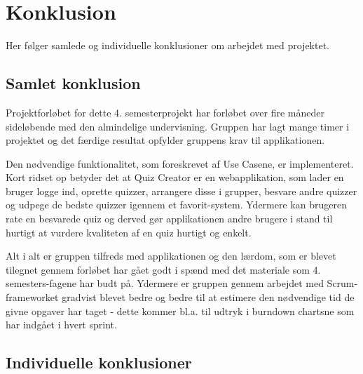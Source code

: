 \chapter{Konklusion}
Her følger samlede og individuelle konklusioner om arbejdet med projektet.

\section{Samlet konklusion}
Projektforløbet for dette 4. semesterprojekt har forløbet over fire måneder sideløbende med den almindelige undervisning. Gruppen har lagt mange timer i projektet og det færdige resultat opfylder gruppens krav til applikationen.

Den nødvendige funktionalitet, som foreskrevet af Use Casene, er implementeret. Kort ridset op betyder det at Quiz Creator er en webapplikation, som lader en bruger logge ind, oprette quizzer, arrangere disse i grupper, besvare andre quizzer og udpege de bedste quizzer igennem et favorit-system. Ydermere kan brugeren rate en besvarede quiz og derved gør applikationen andre brugere i stand til hurtigt at vurdere kvaliteten af en quiz hurtigt og enkelt.

Alt i alt er gruppen tilfreds med applikationen og den lærdom, som er blevet tilegnet gennem forløbet har gået godt i spænd med det materiale som 4. semesters-fagene har budt på. Ydermere er gruppen gennem arbejdet med Scrum-frameworket gradvist blevet bedre og bedre til at estimere den nødvendige tid de givne opgaver har taget - dette kommer bl.a. til udtryk i burndown chartsne som har indgået i hvert sprint. 

\section{Individuelle konklusioner}









